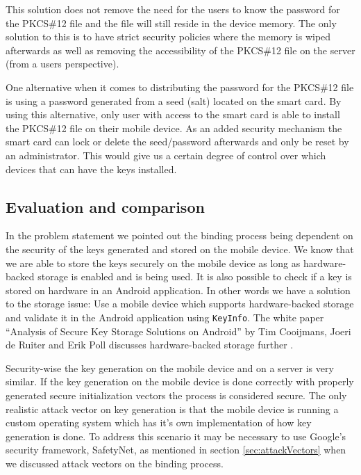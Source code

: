 This solution does not remove the need for the users to know the password for the PKCS\#12 file and the file will still reside in the device memory. The only solution to this is to have strict security policies where the memory is wiped afterwards as well as removing the accessibility of the PKCS\#12 file on the server (from a users perspective).

One alternative when it comes to distributing the password for the PKCS\#12 file is using a password generated from a seed (salt) located on the smart card. By using this alternative, only user with access to the smart card is able to install the PKCS\#12 file on their mobile device. As an added security mechanism the smart card can lock or delete the seed/password afterwards and only be reset by an administrator. This would give us a certain degree of control over which devices that can have the keys installed.

\subsection{Evaluation and comparison}
In the problem statement we pointed out the binding process being dependent on the security of the keys generated and stored on the mobile device. We know that we are able to store the keys securely on the mobile device as long as hardware-backed storage is enabled and is being used. It is also possible to check if a key is stored on hardware in an Android application. In other words we have a solution to the storage issue: Use a mobile device which supports hardware-backed storage and validate it in the Android application using \texttt{KeyInfo}. The white paper ``Analysis of Secure Key Storage Solutions on Android'' by Tim Cooijmans, Joeri de Ruiter and Erik Poll discusses hardware-backed storage further \cite{KeyStorage}.

Security-wise the key generation on the mobile device and on a server is very similar. If the key generation on the mobile device is done correctly with properly generated secure initialization vectors the process is considered secure. The only realistic attack vector on key generation is that the mobile device is running a custom operating system which has it's own implementation of how key generation is done. To address this scenario it may be necessary to use Google's security framework, SafetyNet, as mentioned in section \ref{sec:attackVectors} when we discussed attack vectors on the binding process.

